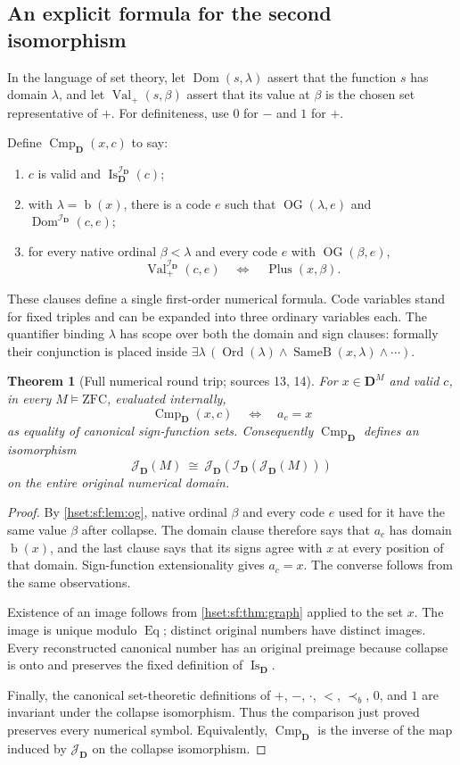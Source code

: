 \documentclass[11pt,letterpaper]{article}
\newtheorem{theorem}{Theorem}[section]
\theoremstyle{definition}
\theoremstyle{remark}
\newcommand{\Ord}{\operatorname{Ord}}
\newcommand{\bd}{\operatorname{b}}
\newcommand{\I}{\mathcal I}
\newcommand{\J}{\mathcal J}
\newcommand{\ZFC}{\mathrm{ZFC}}
\newcommand{\precb}{\prec_b}
\newcommand{\EqB}{\operatorname{SameB}}
\newcommand{\Plusp}{\operatorname{Plus}}
\newcommand{\Eqc}{\operatorname{Eq}}
\newcommand{\OG}{\operatorname{OG}}
\newcommand{\Cmp}{\operatorname{Cmp}}
\newcommand{\Dd}{\mathbf{D}}
\begin{document}
\subsection{An explicit formula for the second isomorphism}

In the language of set theory, let $\operatorname{Dom}(s,\lambda)$ assert that
the function $s$ has domain $\lambda$, and let $\operatorname{Val}_+(s,\beta)$
assert that its value at $\beta$ is the chosen set representative of $+$. For
definiteness, use $0$ for $-$ and $1$ for $+$.

Define $\Cmp_{\Dd}(x,c)$ to say:
\begin{enumerate}[label=(\roman*)]
\item $c$ is valid and $\operatorname{Is}_{\Dd}^{\I_{\Dd}}(c)$;
\item with $\lambda=\bd(x)$, there is a code $e$ such that $\OG(\lambda,e)$ and
$\operatorname{Dom}^{\I_{\Dd}}(c,e)$;
\item for every native ordinal $\beta<\lambda$ and every code $e$ with
$\OG(\beta,e)$,
\[
 \operatorname{Val}_+^{\I_{\Dd}}(c,e)\quad\Longleftrightarrow\quad\Plusp(x,\beta).
\]
\end{enumerate}
These clauses define a single first-order numerical formula. Code variables stand
for fixed triples and can be expanded into three ordinary variables each. The
quantifier binding $\lambda$ has scope over both the domain and sign clauses:
formally their conjunction is placed inside
$\exists\lambda\,(\Ord(\lambda)\land\EqB(x,\lambda)\land\cdots)$.

\begin{theorem}[Full numerical round trip; sources 13, 14]\label{hset:sf:thm:roundtrip}
For $x\in\Dd^M$ and valid $c$, in every $M\models\ZFC$, evaluated internally,
\[
 \Cmp_{\Dd}(x,c)\quad\Longleftrightarrow\quad a_c=x
\]
as equality of canonical sign-function sets. Consequently $\Cmp_{\Dd}$ defines an
isomorphism
\[
 \J_{\Dd}(M)\ \cong\ \J_{\Dd}(\I_{\Dd}(\J_{\Dd}(M)))
\]
on the entire original numerical domain.
\end{theorem}
\begin{proof}
By \cref{hset:sf:lem:og}, native ordinal $\beta$ and every code $e$ used for it
have the same value $\beta$ after collapse. The domain clause therefore says that
$a_c$ has domain $\bd(x)$, and the last clause says that its signs agree with $x$
at every position of that domain. Sign-function extensionality gives $a_c=x$. The
converse follows from the same observations.

Existence of an image follows from \cref{hset:sf:thm:graph} applied to the set
$x$. The image is unique modulo $\Eqc$; distinct original numbers have distinct
images. Every reconstructed canonical number has an original preimage because
collapse is onto and preserves the fixed definition of $\operatorname{Is}_{\Dd}$.

Finally, the canonical set-theoretic definitions of $+$, $-$, $\cdot$, $<$,
$\precb$, $0$, and $1$ are invariant under the collapse isomorphism. Thus the
comparison just proved preserves every numerical symbol. Equivalently,
$\Cmp_{\Dd}$ is the inverse of the map induced by $\J_{\Dd}$ on the collapse
isomorphism.
\end{proof}
\end{document}
